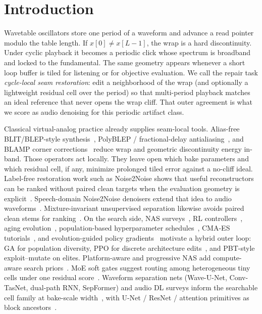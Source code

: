 \section{Introduction}
\label{sec:introduction}

Wavetable oscillators store one period of a waveform and advance a read pointer modulo the table length.
If $x[0]\neq x[L-1]$, the wrap is a hard discontinuity. Under cyclic playback it becomes a periodic click whose spectrum is broadband and locked to the fundamental.
The same geometry appears whenever a short loop buffer is tiled for listening or for objective evaluation.
We call the repair task \emph{cycle-local seam restoration}: edit a neighborhood of the wrap (and optionally a lightweight residual cell over the period) so that multi-period playback matches an ideal reference that never opens the wrap cliff.
That outer agreement is what we score as audio denoising for this periodic artifact class.

Classical virtual-analog practice already supplies seam-local tools.
Alias-free BLIT/BLEP-style synthesis~\cite{stilson1996}, PolyBLEP / fractional-delay antialiasing~\cite{nam2009polyblep}, and BLAMP corner corrections~\cite{esqueda2016blamp} reduce wrap and geometric discontinuity energy in-band.
Those operators act locally.
They leave open which bake parameters and which residual cell, if any, minimize prolonged tiled error against a no-cliff ideal.
Label-free restoration work such as Noise2Noise shows that useful reconstructors can be ranked without paired clean targets when the evaluation geometry is explicit~\cite{lehtinen2018}.
Speech-domain Noise2Noise denoisers extend that idea to audio waveforms~\cite{kashyap2021n2n}.
Mixture-invariant unsupervised separation likewise avoids paired clean stems for ranking~\cite{wisdom2020}.
On the search side, NAS surveys~\cite{elsken2019}, RL controllers~\cite{zoph2017nas,pham2018}, aging evolution~\cite{real2017large,real2019}, population-based hyperparameter schedules~\cite{jaderberg2017}, CMA-ES tutorials~\cite{hansen2016cmaes}, and evolution-guided policy gradients~\cite{khadka2018} motivate a hybrid outer loop: GA for population diversity, PPO for discrete architecture edits~\cite{schulman2017}, and PBT-style exploit--mutate on elites.
Platform-aware and progressive NAS add compute-aware search priors~\cite{tan2019mnasnet,liu2018pnas}.
MoE soft gates suggest routing among heterogeneous tiny cells under one residual score~\cite{shazeer2017}.
Waveform separation nets (Wave-U-Net, Conv-TasNet, dual-path RNN, SepFormer) and audio DL surveys inform the searchable cell family at bake-scale width~\cite{stoller2018,macartney2018,luo2019,luo2020dprnn,subakan2021,purwins2019,gong2021ast}, with U-Net / ResNet / attention primitives as block ancestors~\cite{ronneberger2015,he2016resnet,vaswani2017,jansson2017}.

